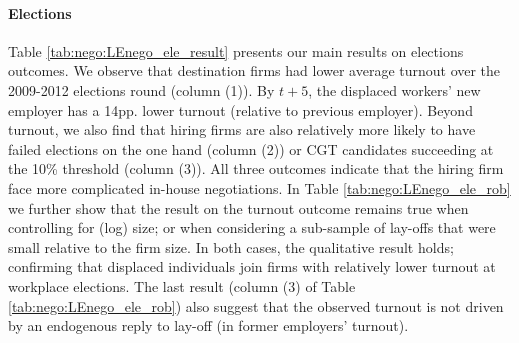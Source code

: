 \paragraph{Elections}
Table \ref{tab:nego:LEnego_ele_result} presents our main results on elections outcomes. We observe that destination firms had lower average turnout over the 2009-2012 elections round (column (1)). By $t+5$, the displaced workers' new employer has a 14pp. lower turnout (relative to previous employer). Beyond turnout, we also find that hiring firms are also relatively more likely to have failed elections on the one hand (column (2)) or CGT candidates succeeding at the 10\% threshold (column (3)). All three outcomes indicate that the hiring firm face more complicated in-house negotiations. In Table \ref{tab:nego:LEnego_ele_rob} we further show that the result on the turnout outcome remains true when controlling for (log) size; or when considering a sub-sample of lay-offs that were small relative to the firm size. In both cases, the qualitative result holds; confirming that displaced individuals join firms with relatively lower turnout at workplace elections. The last result (column (3) of Table \ref{tab:nego:LEnego_ele_rob}) also suggest that the observed turnout is not driven by an endogenous reply to lay-off (in former employers' turnout).
 

